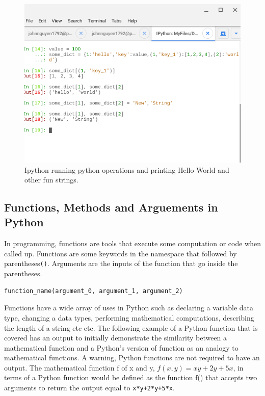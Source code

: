 \documentclass[11pt,a4paper]{book}
\begin{document}
			\begin{figure} [!ht]
				\centering
				\def\svgwidth{\columnwidth}
				\Huge
				\includegraphics[scale=0.5]{images/chapter-8/dictionary_python_example}
				\caption{Ipython running python operations and printing Hello World and other fun strings.}
				\label{fig:dictionary_python_example}
			\end{figure}
		
		\subsection{Functions, Methods and Arguements in Python}
			\label{subsec:Functions and Arguements in Python}
			In programming, functions are tools that execute some computation or code when called up. Functions are some keywords in the namespace that followed by parentheses\lstinline|()|. Arguments are the inputs of the function that go inside the parentheses. 
			
			\begin{lstlisting}[caption = Function structure]
			function_name(argument_0, argument_1, argument_2)
			\end{lstlisting}
			
			Functions have a wide array of uses in Python such as declaring a variable data type, changing a data types, performing mathematical computations, describing the length of a string etc etc.  The following example of a Python function that is covered has an output to initially demonstrate the similarity between a mathematical function and a Python's version of function as an analogy to mathematical functions. A warning, Python functions are not required to have an output. The mathematical function f of x and y, $f(x,y)=xy+2y+5x$, in terms of a Python function would be defined as the function f() that accepts two arguments to return the output equal to \lstinline{x*y+2*y+5*x}.
			
\end{document}
